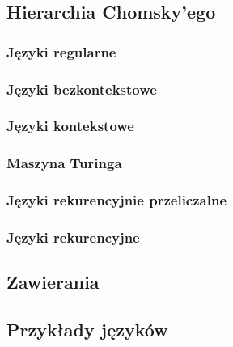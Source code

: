 \subsection{Hierarchia Chomsky'ego}

\subsubsection{Języki regularne}


\subsubsection{Języki bezkontekstowe}


\subsubsection{Języki kontekstowe}


\subsubsection{Maszyna Turinga}


\subsubsection{Języki rekurencyjnie przeliczalne}


\subsubsection{Języki rekurencyjne}


\subsection{Zawierania}


\subsection{Przykłady języków}

